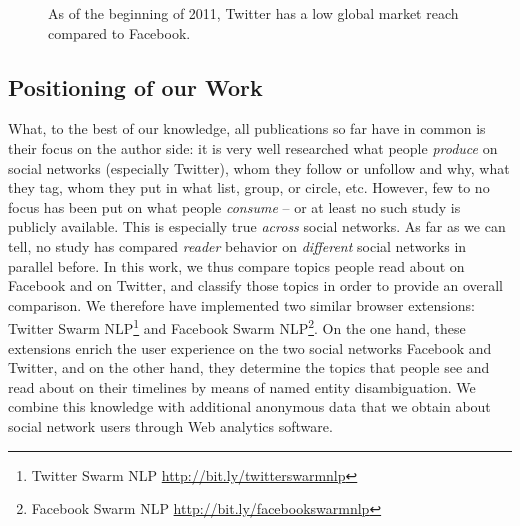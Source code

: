 \documentclass{iosart2c}
\begin{document}
\begin{figure}
  \centering
    \qquad
\caption{As of the beginning of 2011, Twitter has a low global market reach compared to Facebook.}
\label{fig:globalmarkets}
\end{figure}

\subsection{Positioning of our Work}
What, to the best of our knowledge, all publications so far have in common is their focus on the author side: it is very well researched what people \emph{produce} on social networks (especially Twitter), whom they follow or unfollow and why, what they tag, whom they put in what list, group, or circle, etc.
However, few to no focus has been put on what people \emph{consume} -- or at least no such study is publicly available.
This is especially true \emph{across} social networks.
As far as we can tell, no study has compared \emph{reader} behavior on \emph{different} social networks in parallel before.
In this work, we thus compare topics people read about on Facebook and on Twitter, and classify those topics in order to provide an overall comparison. 
We therefore have implemented two similar browser extensions: Twitter Swarm NLP\footnote{Twitter Swarm NLP \url{http://bit.ly/twitterswarmnlp}} and Facebook Swarm NLP\footnote{Facebook Swarm NLP \url{http://bit.ly/facebookswarmnlp}}. 
On the one hand, these extensions enrich the user experience on the two social networks Facebook and Twitter, and on the other hand, they determine the topics that people see and read about on their timelines by means of named entity disambiguation.
We combine this knowledge with additional anonymous data that we obtain about social network users through Web analytics software.
\end{document}
